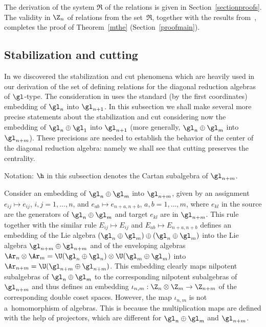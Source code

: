\documentclass[11pt]{article}
\numberwithin{equation}{section}
\begin{document}
The derivation of the system $\mathfrak{R}$ of the relations is given in Section~\ref{sectionproofs}. The validity in $\Z_n$ of relations from the
set~$\mathfrak{R}$, together with the results
from~\cite{KO3}, completes the proof of Theorem~\ref{mthe} (Section~\ref{proofmain}).

\setcounter{section}{4}
\setcounter{subsection}{5}
\setcounter{subsubsection}{0}
\setcounter{equation}{19}
\subsection{Stabilization and cutting} \label{subsection3.4}

In \cite{KO3} we discovered the stabilization and cut phenomena which are heavily used in our derivation of the set of def\/ining relations for the
diagonal reduction algebras of $\gl$-type. The consideration in \cite{KO3} uses the standard (by the f\/irst coordinates) embedding of $\gl_n$ into $\gl_{n+1}$.
In this subsection we shall make several more precise statements about the stabilization and cut considering now the embedding of $\gl_n\oplus\gl_1$
into $\gl_{n+1}$ (more generally, $\gl_n\oplus\gl_m$ into $\gl_{n+m}$). These precisions are needed to establish the behavior of the center of
the diagonal reduction algebra: namely we shall see that cutting preserves the centrality.


Notation: $\h$ in this subsection denotes the Cartan subalgebra of $\gl_{n+m}$.


Consider an embedding of $\gl_n\oplus \gl_m$ into $\gl_{n+m}$, given by an assignment $e_{ij}\mapsto e_{ij}$, $i,j=1,\ldots,n$, and
$e_{ab}\mapsto e_{n+a,n+b}$, $a,b=1,\ldots,m$, where $e_{kl}$ in the source are the generators of $\gl_n\oplus \gl_m$ and target $e_{kl}$
are in $\gl_{n+m}$. This rule together with the similar rule $E_{ij}\mapsto E_{ij}$ and $E_{ab}\mapsto E_{n+a,n+b}$ def\/ines an embedding of the Lie
algebra $(\gl_n\oplus \gl_m)\oplus(\gl_n\oplus \gl_m)$ into the Lie algebra $\gl_{n+m}\oplus\gl_{n+m}$ and of the enveloping algebras
$\Ar_n\otimes \Ar_m=\U(\gl_n\oplus\gl_n)\otimes \U(\gl_m\oplus\gl_m)$ into $\Ar_{n+m}=\U(\gl_{n+m}\oplus\gl_{n+m})$. This embedding clearly
maps nilpotent subalgebras of $\gl_n\oplus \gl_m$ to the corresponding nilpotent subalgebras of $\gl_{n+m}$ and thus def\/ines an embedding
$\iota_{n,m}:\Z_n\otimes\Z_m\to \Z_{n+m}$ of the corresponding double coset spaces. However, the map $\iota_{n,m}$ is not a~homomorphism of
algebras. This is because the multiplication maps are def\/ined with the help of projectors, which are dif\/ferent for $\gl_n\oplus \gl_m$ and $\gl_{n+m}$.
\end{document}
